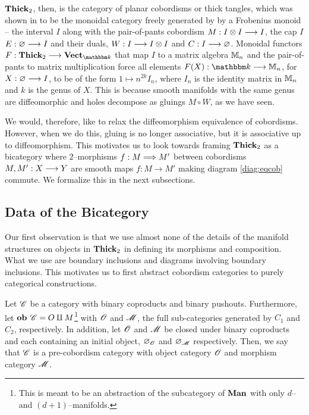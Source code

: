 \documentclass[./Thick_TQFTs_and_Quantum_Information.tex]{subfiles}
\begin{document}
$\textbf{Thick}_2$, then, is the category of planar cobordisms or thick tangles, which
was shown in \cite{NonCommTQFT} to be the monoidal category freely generated by
by a Frobenius monoid -- the interval $I$ along with the pair-of-pants cobordism
$M : I \otimes I \stackrel{}{\longrightarrow} I$, the cap $I$ $E : \varnothing \stackrel{}{\longrightarrow} I$ and their duals,
$W : I \stackrel{}{\longrightarrow} I \otimes I$ and $C : I \stackrel{}{\longrightarrow} \varnothing$. Monoidal functors
$F : \Thick_2 \to \Vect_{\K}$ that map $I$ to a matrix algebra $\mathbb{M}_n$
and the pair-of-pants to matrix multiplication force all elements
$F(X) : \K \to \M_n$, for $X : \varnothing \stackrel{}{\longrightarrow} I$, to be of the form
$1 \mapsto n^{2k}I_n$, where $I_n$ is the identity matrix in $\mathbb{M}_n$ and $k$ is
the genus of $X$. This is because smooth manifolds with the same genus are
diffeomorphic and holes decompose as gluings $M \circ W$, as we have seen.

We would, therefore, like to relax the diffeomorphism equivalence of cobordisms.
However, when we do this, gluing is no longer associative, but it is associative
up to diffeomorphism.  This motivates us to look towards framing $\textbf{Thick}_2$ as a
bicategory where $2$--morphisms $f : M \stackrel{}{\Longrightarrow} M'$ between cobordisms $M,
M' : X \stackrel{}{\longrightarrow} Y$ are smooth maps $f : M \to M'$ making diagram \eqref{diag:eqcob}
commute. We formalize this in the next subsections.

\subsection{Data of the Bicategory}

Our first observation is that we use almost none of the details of the manifold
structures on objects in $\textbf{Thick}_2$ in defining its morphisms and composition.
What we use are boundary inclusions and diagrams involving boundary inclusions.
This motivates us to first abstract cobordism categories to purely categorical
constructions.

\begin{defn}
Let $\mathscr{C}$ be a category with binary coproducts and binary pushouts.
Furthermore, let $\textbf{ob } \mathscr{C} = O \amalg M$\footnote{This is meant to be an
abstraction of the subcategory of $\textbf{Man}$ with only $d$-- and
$(d + 1)$--manifolds.} with $\mathscr{O}$ and $\mathscr{M}$, the full
sub-categories generated by $C_1$ and $C_2$, respectively. In addition, let
$\mathscr{O}$ and $\mathscr{M}$ be closed under binary coproducts and each
containing an initial object, $\varnothing_{\mathscr{O}}$ and $\varnothing_{\mathscr{M}}$
respectively. Then, we say that $\mathscr{C}$ is a pre-cobordism category with object
category $\mathscr{O}$ and morphism category $\mathscr{M}$.
\end{defn}
\end{document}
